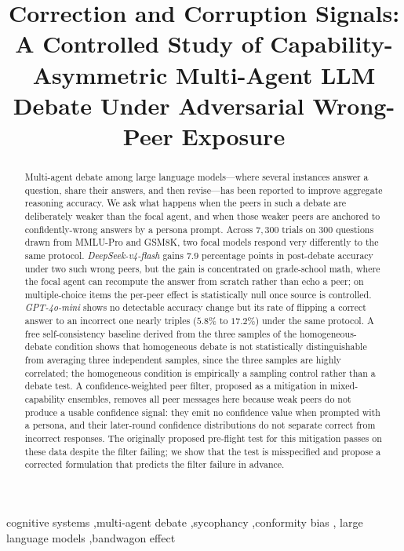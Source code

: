\documentclass[review,3p,authoryear]{elsarticle}
\begin{document}
\begin{frontmatter}

\title{Correction and Corruption Signals: A Controlled Study of
Capability-Asymmetric Multi-Agent LLM Debate Under Adversarial
Wrong-Peer Exposure}




\begin{keyword}
cognitive systems \sep multi-agent debate \sep sycophancy \sep conformity bias \sep
large language models \sep bandwagon effect
\end{keyword}

\begin{abstract}
Multi-agent debate among large language models---where several
instances answer a question, share their answers, and then
revise---has been reported to improve aggregate reasoning accuracy.
We ask what happens when the peers in such a debate are deliberately
weaker than the focal agent, and when those weaker peers are
anchored to confidently-wrong answers by a persona prompt.
Across $7{,}300$ trials on $300$ questions drawn from MMLU-Pro and
GSM8K, two focal models respond very differently to the same
protocol.
\textit{DeepSeek-v4-flash} gains $7.9$ percentage points in
post-debate accuracy under two such wrong peers, but the gain is
concentrated on grade-school math, where the focal agent can
recompute the answer from scratch rather than echo a peer; on
multiple-choice items the per-peer effect is statistically null
once source is controlled.
\textit{GPT-4o-mini} shows no detectable accuracy change but its
rate of flipping a correct answer to an incorrect one nearly triples
($5.8\%$ to $17.2\%$) under the same protocol.
A free self-consistency baseline derived from the three samples of
the homogeneous-debate condition shows that homogeneous debate is
not statistically distinguishable from averaging three independent
samples, since the three samples are highly correlated; the
homogeneous condition is empirically a sampling control rather than
a debate test.
A confidence-weighted peer filter, proposed as a mitigation in
mixed-capability ensembles, removes all peer messages here because
weak peers do not produce a usable confidence signal: they emit no
confidence value when prompted with a persona, and their later-round
confidence distributions do not separate correct from incorrect
responses.
The originally proposed pre-flight test for this mitigation passes
on these data despite the filter failing; we show that the test is
misspecified and propose a corrected formulation that predicts the
filter failure in advance.
\end{abstract}

\end{frontmatter}
\end{document}
